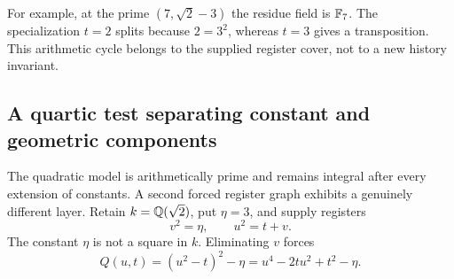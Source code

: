 For example, at the prime
\((7,\sqrt2-3)\) the residue field is \(\mathbb{F}_7\).  The specialization \(t=2\)
splits because \(2=3^2\), whereas \(t=3\) gives a transposition.  This arithmetic
cycle belongs to the supplied register cover, not to a new history invariant.

\subsection{A quartic test separating constant and geometric components}
\label{subsec:quartic-register-test}

The quadratic model is arithmetically prime and remains integral after every
extension of constants.  A second forced register graph exhibits a genuinely
different layer.  Retain \(k=\mathbb{Q}(\sqrt2)\), put \(\eta=3\), and supply registers
\begin{equation}
 v^2=\eta,
 \qquad
 u^2=t+v.
 \label{eq:quartic-register-tower}
\end{equation}
The constant \(\eta\) is not a square in \(k\).  Eliminating \(v\) forces
\begin{equation}
 Q(u,t)=(u^2-t)^2-\eta
       =u^4-2tu^2+t^2-\eta.
 \label{eq:forced-register-quartic}
\end{equation}

